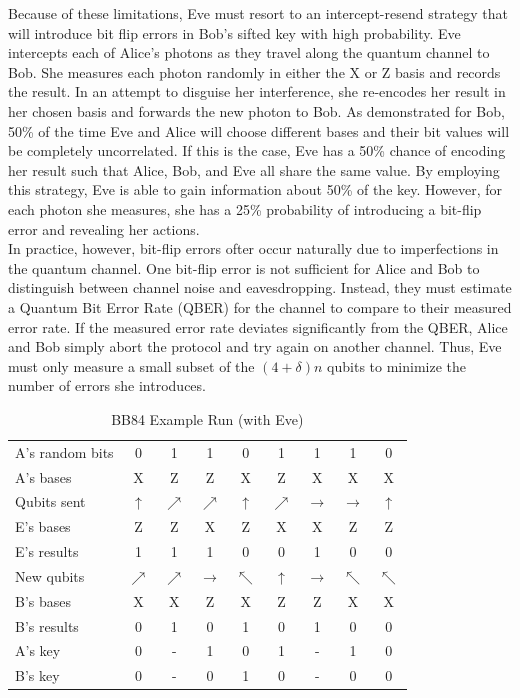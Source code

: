 \documentclass[conference]{IEEEtran}
\begin{document}
Because of these limitations, Eve must resort to an intercept-resend strategy that will introduce bit flip errors in Bob's sifted key with high probability. Eve intercepts each of Alice's photons as they travel along the quantum channel to Bob. She measures each photon randomly in either the X or Z basis and records the result. In an attempt to disguise her interference, she re-encodes her result in her chosen basis and forwards the new photon to Bob. As demonstrated for Bob, 50\% of the time Eve and Alice will choose different bases and their bit values will be completely uncorrelated. If this is the case, Eve has a 50\% chance of encoding her result such that Alice, Bob, and Eve all share the same value. By employing this strategy, Eve is able to gain information about 50\% of the key. However, for each photon she measures, she has a 25\% probability of introducing a bit-flip error and revealing her actions.\\

In practice, however, bit-flip errors ofter occur naturally due to imperfections in the quantum channel. One bit-flip error is not sufficient for Alice and Bob to distinguish between channel noise and eavesdropping. Instead, they must estimate a Quantum Bit Error Rate (QBER) for the channel to compare to their measured error rate. If the measured error rate deviates significantly from the QBER, Alice and Bob simply abort the protocol and try again on another channel. Thus, Eve must only measure a small subset of the $(4+\delta)n$ qubits to minimize the number of errors she introduces.\\

\begin{table}[h]
\caption{BB84 Example Run (with Eve)}
\begin{center}
  \begin{tabular}{|l|c c c c c c c c|}
    \hline
    A's random bits & 0 & 1 & 1 & 0 & 1 & 1 & 1 & 0\\
    A's bases       & X & Z & Z & X & Z & X & X & X\\
    Qubits sent & $\uparrow$ & $\nearrow$ & $\nearrow$ & $\uparrow$ & $\nearrow$ & $\rightarrow$ & $\rightarrow$ & $\uparrow$\\
    E's bases       & Z & Z & X & Z & X & X & Z & Z\\
    E's results     & 1 & 1 & 1 & 0 & 0 & 1 & 0 & 0\\
    New qubits  & $\nearrow$ & $\nearrow$ & $\rightarrow$ & $\nwarrow$ & $\uparrow$ & $\rightarrow$ & $\nwarrow$ & $\nwarrow$\\
    B's bases       & X & X & Z & X & Z & Z & X & X\\
    B's results     & 0 & 1 & 0 & 1 & 0 & 1 & 0 & 0\\
    \hline
    A's key         & 0 & - & 1 & 0 & 1 & - & 1 & 0\\
    B's key         & 0 & - & 0 & 1 & 0 & - & 0 & 0\\
    \hline
  \end{tabular}
\end{center}
\end{table}
\end{document}
